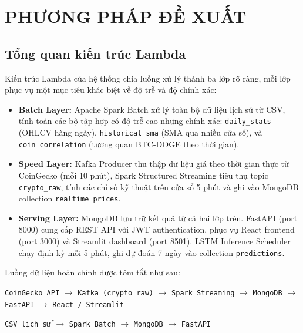 \documentclass[12pt, a4paper]{report}
\begin{document}
\chapter{PHƯƠNG PHÁP ĐỀ XUẤT}

\section{Tổng quan kiến trúc Lambda}

Kiến trúc Lambda của hệ thống chia luồng xử lý thành ba lớp rõ ràng, mỗi lớp phục
vụ một mục tiêu khác biệt về độ trễ và độ chính xác:

\begin{itemize}
  \item \textbf{Batch Layer:} Apache Spark Batch xử lý toàn bộ dữ liệu lịch sử từ CSV,
    tính toán các bộ tập hợp có độ trễ cao nhưng chính xác: \texttt{daily\_stats}
    (OHLCV hàng ngày), \texttt{historical\_sma} (SMA qua nhiều cửa sổ), và
    \texttt{coin\_correlation} (tương quan BTC-DOGE theo thời gian).
  \item \textbf{Speed Layer:} Kafka Producer thu thập dữ liệu giá theo thời gian thực từ
    CoinGecko (mỗi 10 phút), Spark Structured Streaming tiêu thụ topic \texttt{crypto\_raw},
    tính các chỉ số kỹ thuật trên cửa sổ 5 phút và ghi vào MongoDB collection
    \texttt{realtime\_prices}.
  \item \textbf{Serving Layer:} MongoDB lưu trữ kết quả từ cả hai lớp trên. FastAPI (port
    8000) cung cấp REST API với JWT authentication, phục vụ React frontend (port 3000)
    và Streamlit dashboard (port 8501). LSTM Inference Scheduler chạy định kỳ mỗi 5 phút,
    ghi dự đoán 7 ngày vào collection \texttt{predictions}.
\end{itemize}

Luồng dữ liệu hoàn chỉnh được tóm tắt như sau:

\begin{center}
\texttt{CoinGecko API} $\rightarrow$ \texttt{Kafka (crypto\_raw)} $\rightarrow$
\texttt{Spark Streaming} $\rightarrow$ \texttt{MongoDB} $\rightarrow$
\texttt{FastAPI} $\rightarrow$ \texttt{React / Streamlit}
\end{center}

\begin{center}
\texttt{CSV lịch sử} $\rightarrow$ \texttt{Spark Batch} $\rightarrow$
\texttt{MongoDB} $\rightarrow$ \texttt{FastAPI}
\end{center}
\end{document}

